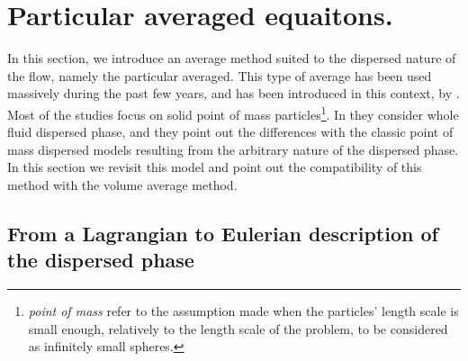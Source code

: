 \section{Particular averaged equaitons.}
\label{sec:Lagrange_to_Euler}
In this section, we introduce an average method suited to the dispersed nature of the flow, namely the particular averaged. 
This type of average has been used massively during the past few years, and has been introduced in this context, by \citet{jackson1997locally,zhang1994ensemble}. 
Most of the studies focus on solid point of mass particles\footnote{\textit{point of mass} refer to the assumption made when the particles' length scale is small enough, relatively to the length scale of the problem, to be considered as infinitely small spheres.}. 
In \citet[Chapter 3]{morel2015mathematical} they consider whole fluid dispersed phase, and they point out the differences with the classic point of mass dispersed models resulting from the arbitrary nature of the dispersed phase. 
In this section we revisit this model and point out the compatibility of this method with the volume average method. 

\subsection{From a Lagrangian to Eulerian description of the dispersed phase}


